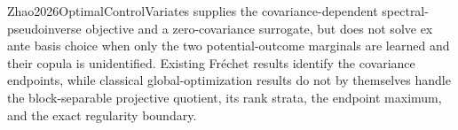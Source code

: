 Zhao2026OptimalControlVariates supplies the covariance-dependent spectral-pseudoinverse objective and a zero-covariance surrogate, but does not solve ex ante basis choice when only the two potential-outcome marginals are learned and their copula is unidentified.  Existing Fr\'echet results identify the covariance endpoints, while classical global-optimization results do not by themselves handle the block-separable projective quotient, its rank strata, the endpoint maximum, and the exact regularity boundary.
